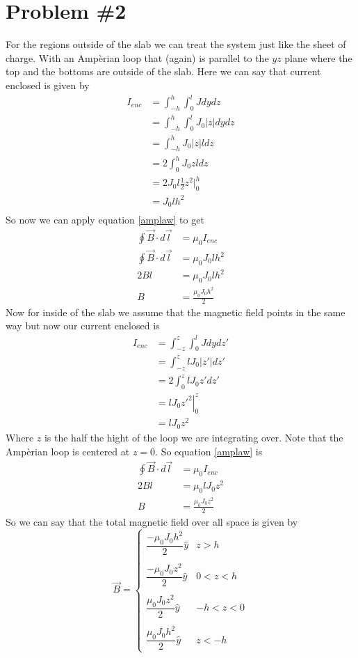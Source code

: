 \documentclass[11pt]{article}
\numberwithin{equation}{section}
\begin{document}
\section{Problem \#2}
For the regions outside of the slab we can treat the system just like the sheet of charge. With an Amp\`{e}rian loop that (again) is parallel to the $yz$ plane where the top and the bottoms are outside of the slab. Here we can say that current enclosed is given by 
\begin{align*}
I_{enc} &= \int_{-h}^h\int_0^{l}Jdydz\\
&= \int_{-h}^h\int_0^{l}J_0|z|dydz\\
&= \int_{-h}^hJ_0|z|ldz\\
&= 2\int_{0}^hJ_0zldz\\
&= 2J_0l\frac{1}{2}z^2|_0^h\\
&= J_0lh^2\\
\end{align*}
So now we can apply equation \ref{amplaw} to get
\begin{align*}
\oint\vec{B}\cdot d\vec{l} &= \mu_0 I_{enc}\\
\oint\vec{B}\cdot d\vec{l} &= \mu_0 J_0lh^2\\
2Bl &= \mu_0 J_0lh^2\\
B &= \frac{\mu_0 J_0h^2}{2}
\end{align*}
Now for inside of the slab we assume that the magnetic field points in the same way but now our current enclosed is 
\begin{align*}
I_{enc} &= \int_{-z}^z\int_0^{l}Jdydz'\\
&= \int_{-z}^zlJ_0|z'|dz'\\
&= 2\int_{0}^zlJ_0z'dz'\\
&= lJ_0\left.z'^2\right|_0^z\\
&= lJ_0z^2
\end{align*}
Where $z$ is the half the hight of the loop we are integrating over. Note that the Amp\`{e}rian loop is centered at $z=0$. So equation \ref{amplaw} is
\begin{align*}
\oint\vec{B}\cdot d\vec{l} &= \mu_0 I_{enc}\\
2Bl &= \mu_0 lJ_0z^2\\
B &= \frac{\mu_0 J_0z^2}{2}
\end{align*}
So we can say that the total magnetic field over all space is given by
$$\vec{B} = \left\{\begin{array}{lc}
	\dfrac{-\mu_0 J_0h^2}{2}\hat{y}	&z>h\\
\\
	\dfrac{-\mu_0 J_0z^2}{2}\hat{y}	&0<z<h\\
\\
	\dfrac{\mu_0 J_0z^2}{2}	\hat{y}	&-h<z<0\\
\\
	\dfrac{\mu_0 J_0h^2}{2}	\hat{y}	&z<-h
		\end{array}\right.$$	
\end{document}
